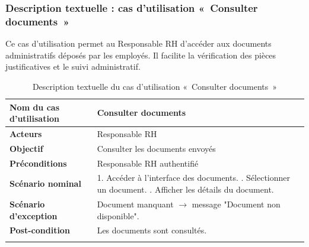 \subsubsection*{Description textuelle : cas d'utilisation «~Consulter documents~»}
Ce cas d'utilisation permet au Responsable RH d'accéder aux documents administratifs déposés par les employés. Il facilite la vérification des pièces justificatives et le suivi administratif.
\begin{center}
\begin{longtable}{|p{5cm}|p{9cm}|}
\hline
\textbf{Nom du cas d'utilisation} & Consulter documents \\ \hline
\textbf{Acteurs} & Responsable RH \\ \hline
\textbf{Objectif} & Consulter les documents envoyés \\ \hline
\textbf{Préconditions} & Responsable RH authentifié \\ \hline
\textbf{Scénario nominal} &
1. Accéder à l'interface des documents. \newline
2. Sélectionner un document. \newline
3. Afficher les détails du document. \\ \hline
\textbf{Scénario d'exception} & Document manquant $\rightarrow$ message "Document non disponible". \\ \hline
\textbf{Post-condition} & Les documents sont consultés. \\ \hline
\caption{Description textuelle du cas d'utilisation «~Consulter documents~»}
\end{longtable}
\end{center}

